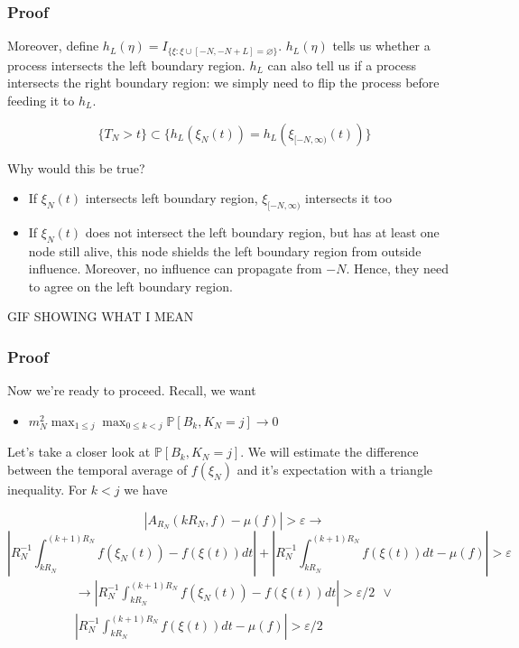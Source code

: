 \documentclass{beamer}
\begin{document}
\begin{frame}
    \frametitle{Proof}
    Moreover, define $h_L(\eta) = I_{\{\xi : \xi \cup [-N, -N+L] = \varnothing\}}$. $h_L(\eta)$ tells us whether a process intersects the left boundary region.
    $h_L$ can also tell us if a process intersects the right boundary region: we simply need to flip the process before feeding it to $h_L$.
    \begin{lemma}
        \[\{T_N > t\} \subset \{h_L(\xi_N(t)) = h_L(\xi_{[-N, \infty)}(t))\}\]
    \end{lemma}
    Why would this be true?
    \begin{itemize}
        \item If $\xi_N(t)$ intersects left boundary region, $\xi_{[-N, \infty)}$ intersects it too
        \item If $\xi_N(t)$ does not intersect the left boundary region, but has at least one node still alive, this node shields the left boundary region from outside influence.
            Moreover, no influence can propagate from $-N$. Hence, they need to agree on the left boundary region.
    \end{itemize}
\end{frame}

\begin{frame}
    GIF SHOWING WHAT I MEAN
\end{frame}

\begin{frame}
    \frametitle{Proof}
    Now we're ready to proceed. Recall, we want

    \begin{itemize}
        \item $m_N^2\max_{1 \leq j}\max_{0 \leq k < j}\mathbb{P}\left[ B_k, K_{N} = j \right] \rightarrow 0$ 
    \end{itemize}

    Let's take a closer look at $\mathbb{P}\left[ B_k, K_{N} = j \right]$. We will estimate the difference between the temporal average of $f(\xi_N)$ and it's expectation with 
    a triangle inequality.
    For $k < j$ we have

    \[
        \left|A_{R_N}(kR_N, f) - \mu(f)\right| > \varepsilon \rightarrow
    \]
    \[
        \left|R_N^{-1}\int_{kR_N}^{(k+1)R_N}f(\xi_N(t)) - f(\xi(t))dt \right| + \left|R_N^{-1}\int_{kR_N}^{(k+1)R_N}f(\xi(t))dt - \mu(f)\right| > \varepsilon
    \]
    \begin{gather*}
        \rightarrow \left|R_N^{-1}\int_{kR_N}^{(k+1)R_N}f(\xi_N(t)) - f(\xi(t))dt \right| > \varepsilon/2 \ \ \lor \\\left|R_N^{-1}\int_{kR_N}^{(k+1)R_N}f(\xi(t))dt - \mu(f)\right| > \varepsilon/2
    \end{gather*}

\end{frame}
\end{document}
